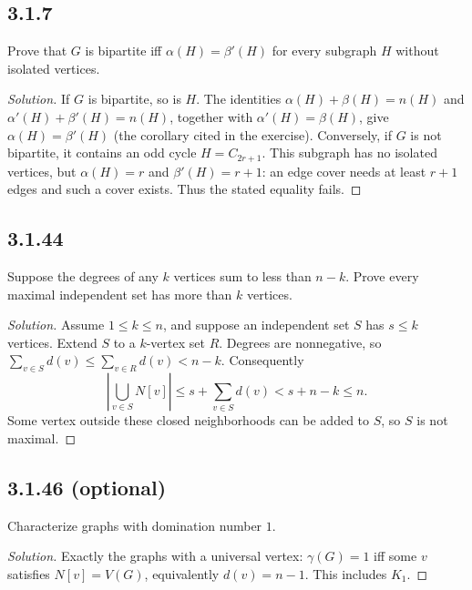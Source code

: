 \documentclass[12pt]{amsart}
\newenvironment{solution}{\begin{proof}[Solution]}{\end{proof}}
\begin{document}
    \subsection*{3.1.7} Prove that $G$ is bipartite iff $\alpha(H)=\beta'(H)$ for every subgraph $H$ without isolated vertices.
    \begin{solution}If $G$ is bipartite, so is $H$. The identities $\alpha(H)+\beta(H)=n(H)$ and $\alpha'(H)+\beta'(H)=n(H)$, together with $\alpha'(H)=\beta(H)$, give $\alpha(H)=\beta'(H)$ (the corollary cited in the exercise).
    Conversely, if $G$ is not bipartite, it contains an odd cycle $H=C_{2r+1}$. This subgraph has no isolated vertices, but $\alpha(H)=r$ and $\beta'(H)=r+1$: an edge cover needs at least $r+1$ edges and such a cover exists. Thus the stated equality fails.\end{solution}

    \subsection*{3.1.44} Suppose the degrees of any $k$ vertices sum to less than $n-k$. Prove every maximal independent set has more than $k$ vertices.
    \begin{solution}Assume $1\le k\le n$, and suppose an independent set $S$ has $s\le k$ vertices. Extend $S$ to a $k$-vertex set $R$. Degrees are nonnegative, so $\sum_{v\in S}d(v)\le\sum_{v\in R}d(v)<n-k$. Consequently
        \[
            \left|\bigcup_{v\in S}N[v]\right|\le s+\sum_{v\in S}d(v)<s+n-k\le n.
        \]
        Some vertex outside these closed neighborhoods can be added to $S$, so $S$ is not maximal.\end{solution}

    \subsection*{3.1.46 (optional)} Characterize graphs with domination number $1$.
    \begin{solution}Exactly the graphs with a universal vertex: $\gamma(G)=1$ iff some $v$ satisfies $N[v]=V(G)$, equivalently $d(v)=n-1$. This includes $K_1$.\end{solution}
\end{document}
